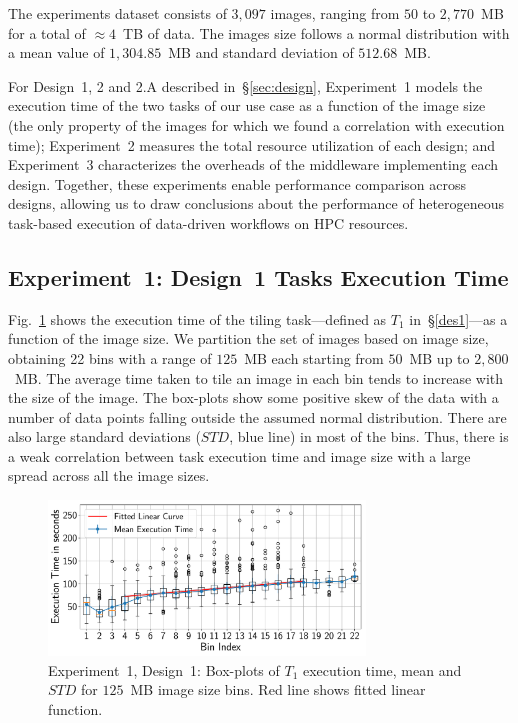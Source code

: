 The experiments dataset consists of $3,097$ images, ranging from $50$ to 
$2,770$~MB for a total of $\approx4$~TB of data. The images size follows a 
normal distribution with a mean value of $1,304.85$~MB and standard deviation 
of $512.68$~MB.

For Design~1, 2 and 2.A described in~\S\ref{sec:design}, Experiment~1 models 
the execution time of the two tasks of our use case as a function of the image 
size (the only property of the images for which we found a correlation with 
execution time); Experiment~2 measures the total resource utilization of each 
design; and Experiment~3 characterizes the overheads of the middleware 
implementing each design. Together, these experiments enable performance 
comparison across designs, allowing us to draw conclusions about the 
performance of heterogeneous task-based execution of data-driven workflows on 
HPC resources.

\subsection{Experiment~1: Design~1 Tasks Execution Time}
\label{ssec:des1analysis}

Fig.~\ref{fig:stage_0_execution} shows the execution time of the tiling 
task---defined as $T_{1}$ in~\S\ref{des1}---as a function of the image size. 
We partition the set of images based on image size, obtaining 22 bins with a 
range of $125$~MB each starting from $50$~MB up to $2,800$~MB. The average 
time taken to tile an image in each bin tends to increase with the size of the 
image. The box-plots show some positive skew of the data with a number of data 
points  falling outside the assumed normal distribution. There are also large 
standard deviations ($STD$, blue line) in most of the bins. Thus, there is a 
weak correlation between task execution time and image size with a large 
spread  across all the image sizes.

\begin{figure}[t]
    \centering
    \includegraphics[width=0.75\textwidth]{figures/designs/stage_0_tx_box.pdf}
    \caption{Experiment~1, Design~1: Box-plots of $T_{1}$ execution time, mean 
    and $STD$ for $125$~MB image size bins.
        Red line shows fitted linear function.}\label{fig:stage_0_execution}
\end{figure}

